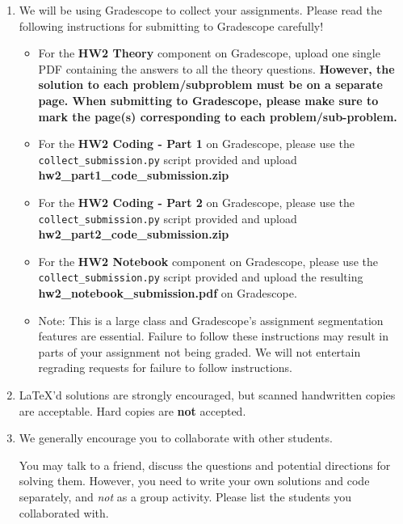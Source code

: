 \documentclass[11pt,english]{article}
\begin{document}
\begin{enumerate}
\item We will be using Gradescope to collect your assignments. Please read the following instructions for submitting to Gradescope carefully!
     \begin{itemize}
          \item
               For the \textbf{HW2 Theory} component on Gradescope, upload one single PDF containing the answers to all the theory questions. \textbf{However, the solution to each problem/subproblem must be on a separate page. When submitting to Gradescope, please make sure to mark the page(s) corresponding to each problem/sub-problem.}
          \item
               For the \textbf{HW2 Coding - Part 1} on Gradescope, please use the \texttt{collect\_submission.py} script provided and upload \textbf{hw2\_part1\_code\_submission.zip}
          \item
               For the \textbf{HW2 Coding - Part 2} on Gradescope, please use the \texttt{collect\_submission.py} script provided and upload \textbf{hw2\_part2\_code\_submission.zip}
          \item
               For the \textbf{HW2 Notebook} component on Gradescope, please use the \texttt{collect\_submission.py} script provided and upload the resulting \textbf{hw2\_notebook\_submission.pdf} on Gradescope.
          \item
               Note: This is a large class and Gradescope's assignment segmentation features are essential.
               Failure to follow these instructions may result in parts of your assignment not being graded.
               We will not entertain regrading requests for failure to follow instructions.
     \end{itemize}

\item
     \LaTeX'd solutions are strongly encouraged, but scanned handwritten copies are acceptable. Hard copies are \textbf{not} accepted.


\item We generally encourage you to collaborate with other students.

You may talk to a friend,
discuss the questions and potential directions for solving them. However, you need to write
your own solutions and code separately, and \emph{not} as a group activity.
Please list the students you collaborated with. \\ \\

\end{enumerate}
\newpage
\end{document}
